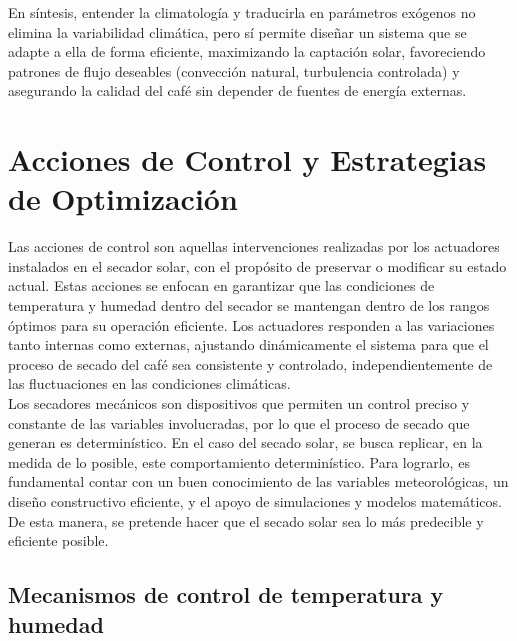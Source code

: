 \documentclass[12pt]{article}
\begin{document}
\noindent En síntesis, entender la climatología y traducirla en parámetros exógenos no elimina la variabilidad climática, pero sí permite diseñar un sistema que se adapte a ella de forma eficiente, maximizando la captación solar, favoreciendo patrones de flujo deseables (convección natural, turbulencia controlada) y asegurando la calidad del café sin depender de fuentes de energía externas.









\section{Acciones de Control y Estrategias de Optimización}

Las acciones de control son aquellas intervenciones realizadas por los actuadores instalados en el secador solar, con el propósito de preservar o modificar su estado actual. Estas acciones se enfocan en garantizar que las condiciones de temperatura y humedad dentro del secador se mantengan dentro de los rangos óptimos para su operación eficiente. Los actuadores responden a las variaciones tanto internas como externas, ajustando dinámicamente el sistema para que el proceso de secado del café sea consistente y controlado, independientemente de las fluctuaciones en las condiciones climáticas.\\


Los secadores mecánicos son dispositivos que permiten un control preciso y constante de las variables involucradas, por lo que el proceso de secado que generan es determinístico. En el caso del secado solar, se busca replicar, en la medida de lo posible, este comportamiento determinístico. Para lograrlo, es fundamental contar con un buen conocimiento de las variables meteorológicas, un diseño constructivo eficiente, y el apoyo de simulaciones y modelos matemáticos. De esta manera, se pretende hacer que el secado solar sea lo más predecible y eficiente posible.\\

\clearpage

\subsection{Mecanismos de control de temperatura y humedad}
\end{document}
